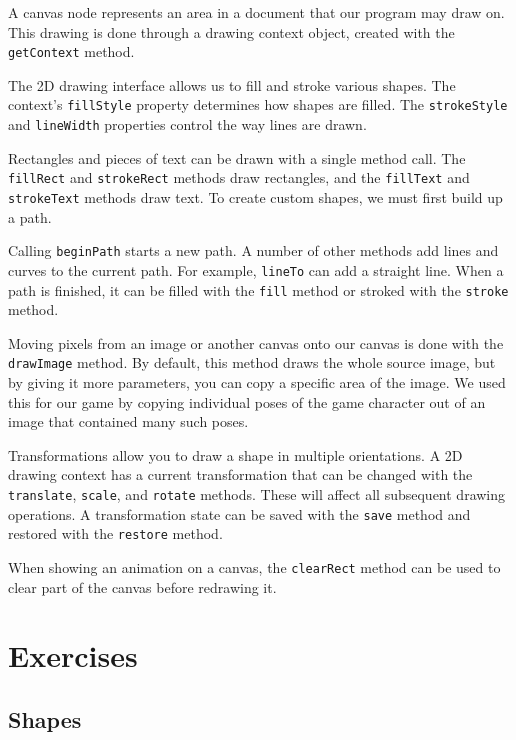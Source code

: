 A canvas node represents an area in a document that our program may draw on. This drawing is done through a drawing context object, created with the \lstinline`getContext` method.

The 2D drawing interface allows us to fill and stroke various shapes. The context's \lstinline`fillStyle` property determines how shapes are filled. The \lstinline`strokeStyle` and \lstinline`lineWidth` properties control the way lines are drawn.

Rectangles and pieces of text can be drawn with a single method call. The \lstinline`fillRect` and \lstinline`strokeRect` methods draw rectangles, and the \lstinline`fillText` and \lstinline`strokeText` methods draw text. To create custom shapes, we must first build up a path.

Calling \lstinline`beginPath` starts a new path. A number of other methods add lines and curves to the current path. For example, \lstinline`lineTo` can add a straight line. When a path is finished, it can be filled with the \lstinline`fill` method or stroked with the \lstinline`stroke` method.

Moving pixels from an image or another canvas onto our canvas is done with the \lstinline`drawImage` method. By default, this method draws the whole source image, but by giving it more parameters, you can copy a specific area of the image. We used this for our game by copying individual poses of the game character out of an image that contained many such poses.

Transformations allow you to draw a shape in multiple orientations. A 2D drawing context has a current transformation that can be changed with the \lstinline`translate`, \lstinline`scale`, and \lstinline`rotate` methods. These will affect all subsequent drawing operations. A transformation state can be saved with the \lstinline`save` method and restored with the \lstinline`restore` method.

When showing an animation on a canvas, the \lstinline`clearRect` method can be used to clear part of the canvas before redrawing it.

\section{Exercises}

\subsection{Shapes}

